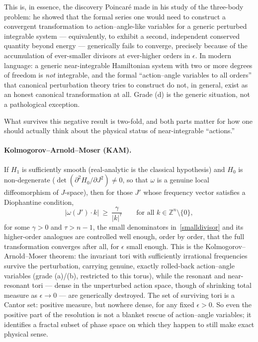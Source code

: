 This is, in essence, the discovery Poincar\'e made in his study of the
three-body problem: he showed that the formal series one would need to
construct a convergent transformation to action--angle-like variables for a
generic perturbed integrable system --- equivalently, to exhibit a second,
independent conserved quantity beyond energy --- generically fails to converge,
precisely because of the accumulation of ever-smaller divisors at ever-higher
orders in $\epsilon$. In modern language: a generic
near-integrable Hamiltonian system with two or more degrees of freedom is
\emph{not} integrable, and the formal ``action--angle variables to all orders''
that canonical perturbation theory tries to construct do not, in general, exist
as an honest canonical transformation at all. Grade (d)  is the
generic situation, not a pathological exception.

What survives this negative result is two-fold, and both parts matter for how
one should actually think about the physical status of near-integrable
``actions.''

\paragraph{Kolmogorov--Arnold--Moser (KAM).} If $H_1$ is sufficiently smooth
(real-analytic is the classical hypothesis) and $H_0$ is non-degenerate
($\det(\partial^2H_0/\partial J^2)\neq0$, so that $\omega$ is a genuine local
diffeomorphism of $J$-space), then for those $J'$ whose frequency vector
satisfies a Diophantine condition,
\begin{equation}
|\omega(J')\cdot k|\ \ge\ \frac{\gamma}{|k|^{\tau}}
    \qquad\text{for all }k\in\mathbb Z^n\setminus\{0\},
\label{diophantine}
\end{equation}
for some $\gamma>0$ and $\tau>n-1$, the small denominators
in~\eqref{smalldivisor} and its higher-order analogues are controlled well
enough, order by order, that the full transformation converges after all, for
$\epsilon$ small enough. This is the Kolmogorov--Arnold--Moser theorem:
the invariant tori with
sufficiently irrational frequencies survive the perturbation, carrying genuine,
exactly rolled-back action--angle variables (grade (a)/(b),
restricted to this torus), while the resonant and near-resonant tori --- dense
in the unperturbed action space, though of shrinking total measure as
$\epsilon\to0$ --- are generically destroyed. The set of surviving tori is a
Cantor set: positive measure, but nowhere dense, for any fixed $\epsilon>0$. So
even the positive part of the resolution is not a blanket rescue of
action--angle variables; it identifies a fractal subset of phase space on which
they happen to still make exact physical sense.

